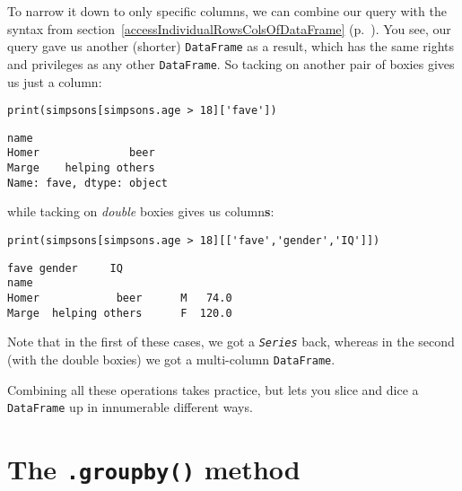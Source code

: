 To narrow it down to only specific columns, we can combine our query with the
syntax from section~\ref{accessIndividualRowsColsOfDataFrame}
(p.~\pageref{accessIndividualRowsColsOfDataFrame}). You see, our query gave us
another (shorter) \texttt{DataFrame} as a result, which has the same rights and
privileges as any other \texttt{DataFrame}. So tacking on another pair of
boxies gives us just a column:

\begin{Verbatim}[fontsize=\small,samepage=true,frame=single,framesep=3mm]
print(simpsons[simpsons.age > 18]['fave'])
\end{Verbatim}
\vspace{-.2in}

\begin{Verbatim}[fontsize=\small,samepage=true,frame=leftline,framesep=5mm,framerule=1mm]
name
Homer              beer
Marge    helping others
Name: fave, dtype: object
\end{Verbatim}

while tacking on \textit{double} boxies gives us column\textbf{s}:

\begin{Verbatim}[fontsize=\small,samepage=true,frame=single,framesep=3mm]
print(simpsons[simpsons.age > 18][['fave','gender','IQ']])
\end{Verbatim}
\vspace{-.2in}

\begin{Verbatim}[fontsize=\small,samepage=true,frame=leftline,framesep=5mm,framerule=1mm]
                 fave gender     IQ
name                               
Homer            beer      M   74.0
Marge  helping others      F  120.0
\end{Verbatim}

Note that in the first of these cases, we got a \textit{\texttt{Series}} back,
whereas in the second (with the double boxies) we got a multi-column
\texttt{DataFrame}.

Combining all these operations takes practice, but lets you slice and dice a
\texttt{DataFrame} up in innumerable different ways.

\section{The \texttt{.groupby()} method}

\label{groupby}

